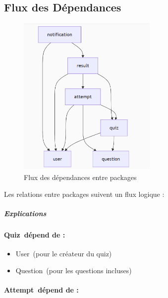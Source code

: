 \documentclass[12pt,a4paper,twoside,openright]{report}
\begin{document}
\hypertarget{flux-des-dependances}{%
\subsection{Flux des Dépendances}\label{flux-des-dependances}}

\begin{figure}[H]
\centering
\includegraphics[width=0.6\textwidth]{latex_media/media/image18.png}
\caption{Flux des dépendances entre packages}
\label{fig:flux-dependances}
\end{figure}

Les
relations entre packages suivent un flux logique :

\hypertarget{explications}{%
\subparagraph{Explications~}\label{explications}}

\hypertarget{quiz-duxe9pend-de}{%
\paragraph{Quiz~dépend de :}\label{quiz-duxe9pend-de}}

\begin{itemize}
\item
  User~(pour le créateur du quiz)
\item
  Question~(pour les questions incluses)
\end{itemize}

\hypertarget{attempt-duxe9pend-de}{%
\paragraph{Attempt~dépend de :}\label{attempt-duxe9pend-de}}
\end{document}
